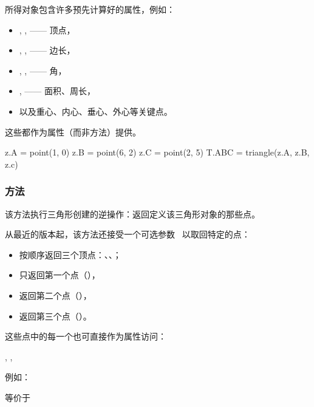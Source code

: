 所得对象包含许多预先计算好的属性，例如：
\begin{itemize}
  \item {}, ,  —— 顶点，
  \item {}, ,  —— 边长，
  \item {}, ,  —— 角，
  \item {},  —— 面积、周长，
  \item 以及重心、内心、垂心、外心等关键点。
\end{itemize}


这些都作为属性（而非方法）提供。

\vspace{1em}
\begin{mybox}
  \begin{tkzexample}
    z.A = point(1, 0)
    z.B = point(6, 2)
    z.C = point(2, 5)
    T.ABC = triangle(z.A, z.B, z.c)
  \end{tkzexample}
\end{mybox}

\subsubsection{方法 }
\label{ssub:method_triangle_get}

该方法执行三角形创建的逆操作：返回定义该三角形对象的那些点。

\medskip

从最近的版本起，该方法还接受一个可选参数~ 以取回特定的点：
\begin{itemize}
  \item {} 按顺序返回三个顶点：、、；
  \item {} 只返回第一个点（），
  \item {} 返回第二个点（），
  \item {} 返回第三个点（）。
\end{itemize}

\medskip

这些点中的每一个也可直接作为属性访问：
\begin{center}
, , 
\end{center}
例如：
\begin{center}
 等价于 
\end{center}

